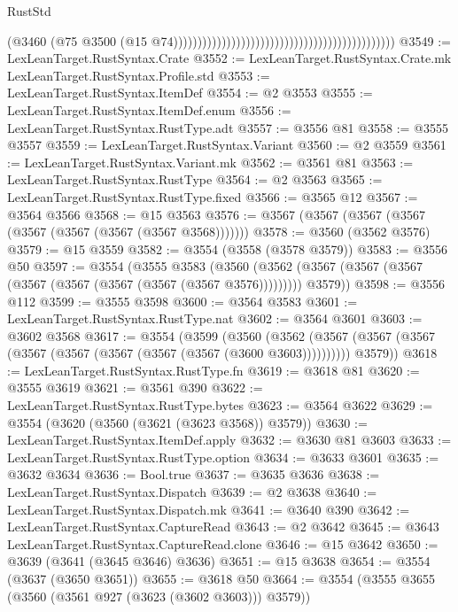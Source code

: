 \begin{lexlean}{RustStd}
\begin{coremodule}
                                                                                          (@3460
                                                                                            (@75
                                                                                              @3500
                                                                                              (@15
                                                                                                @74))))))))))))))))))))))))))))))))))))))))))))))
@3549 := LexLeanTarget.RustSyntax.Crate
@3552 := LexLeanTarget.RustSyntax.Crate.mk LexLeanTarget.RustSyntax.Profile.std
@3553 := LexLeanTarget.RustSyntax.ItemDef
@3554 := @2 @3553
@3555 := LexLeanTarget.RustSyntax.ItemDef.enum
@3556 := LexLeanTarget.RustSyntax.RustType.adt
@3557 := @3556 @81
@3558 := @3555 @3557
@3559 := LexLeanTarget.RustSyntax.Variant
@3560 := @2 @3559
@3561 := LexLeanTarget.RustSyntax.Variant.mk
@3562 := @3561 @81
@3563 := LexLeanTarget.RustSyntax.RustType
@3564 := @2 @3563
@3565 := LexLeanTarget.RustSyntax.RustType.fixed
@3566 := @3565 @12
@3567 := @3564 @3566
@3568 := @15 @3563
@3576 := @3567 (@3567 (@3567 (@3567 (@3567 (@3567 (@3567 (@3567 @3568)))))))
@3578 := @3560 (@3562 @3576)
@3579 := @15 @3559
@3582 := @3554 (@3558 (@3578 @3579))
@3583 := @3556 @50
@3597 := @3554
    (@3555
      @3583
      (@3560 (@3562 (@3567 (@3567 (@3567 (@3567 (@3567 (@3567 (@3567 (@3567 @3576))))))))) @3579))
@3598 := @3556 @112
@3599 := @3555 @3598
@3600 := @3564 @3583
@3601 := LexLeanTarget.RustSyntax.RustType.nat
@3602 := @3564 @3601
@3603 := @3602 @3568
@3617 := @3554
    (@3599
      (@3560
        (@3562 (@3567 (@3567 (@3567 (@3567 (@3567 (@3567 (@3567 (@3567 (@3600 @3603))))))))))
        @3579))
@3618 := LexLeanTarget.RustSyntax.RustType.fn
@3619 := @3618 @81
@3620 := @3555 @3619
@3621 := @3561 @390
@3622 := LexLeanTarget.RustSyntax.RustType.bytes
@3623 := @3564 @3622
@3629 := @3554 (@3620 (@3560 (@3621 (@3623 @3568)) @3579))
@3630 := LexLeanTarget.RustSyntax.ItemDef.apply
@3632 := @3630 @81 @3603
@3633 := LexLeanTarget.RustSyntax.RustType.option
@3634 := @3633 @3601
@3635 := @3632 @3634
@3636 := Bool.true
@3637 := @3635 @3636
@3638 := LexLeanTarget.RustSyntax.Dispatch
@3639 := @2 @3638
@3640 := LexLeanTarget.RustSyntax.Dispatch.mk
@3641 := @3640 @390
@3642 := LexLeanTarget.RustSyntax.CaptureRead
@3643 := @2 @3642
@3645 := @3643 LexLeanTarget.RustSyntax.CaptureRead.clone
@3646 := @15 @3642
@3650 := @3639 (@3641 (@3645 @3646) @3636)
@3651 := @15 @3638
@3654 := @3554 (@3637 (@3650 @3651))
@3655 := @3618 @50
@3664 := @3554 (@3555 @3655 (@3560 (@3561 @927 (@3623 (@3602 @3603))) @3579))

\end{coremodule}
\end{lexlean}
